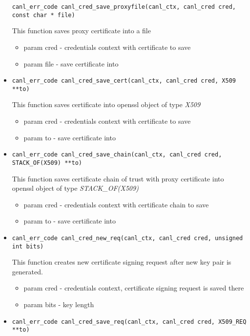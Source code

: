 \begin{itemize}
\begin{verbatim}
canl_err_code canl_cred_save_proxyfile(canl_ctx, canl_cred cred, const char * file)\end{verbatim}
  This function saves proxy certificate into a file
  \begin{itemize}
    \item param cred - credentials context with certificate to save 
    \item param file - save certificate into 
  \end{itemize}
  \item \begin{verbatim}
canl_err_code canl_cred_save_cert(canl_ctx, canl_cred cred, X509 **to)\end{verbatim}
  This function saves certificate into openssl object of type \textit{X509}
  \begin{itemize}
    \item param cred - credentials context with certificate to save
    \item param to - save certificate into
  \end{itemize}
  \item \begin{verbatim}
canl_err_code canl_cred_save_chain(canl_ctx, canl_cred cred, STACK_OF(X509) **to)\end{verbatim}
  This function saves certificate chain of trust with proxy 
  certificate into openssl object of type \textit{STACK\_OF(X509)}
  \begin{itemize}
    \item param cred - credentials context with certificate chain to save
    \item param to - save certificate into
  \end{itemize}
  \item \begin{verbatim}
canl_err_code canl_cred_new_req(canl_ctx, canl_cred cred, unsigned int bits)\end{verbatim}
  This function creates new certificate signing request after new key pair 
  is generated.
   \begin{itemize}
    \item param cred - credentials context, certificate signing request 
    is saved there
    \item param bits - key length
  \end{itemize}
  \item \begin{verbatim}
canl_err_code canl_cred_save_req(canl_ctx, canl_cred cred, X509_REQ **to)\end{verbatim}

\end{itemize}
